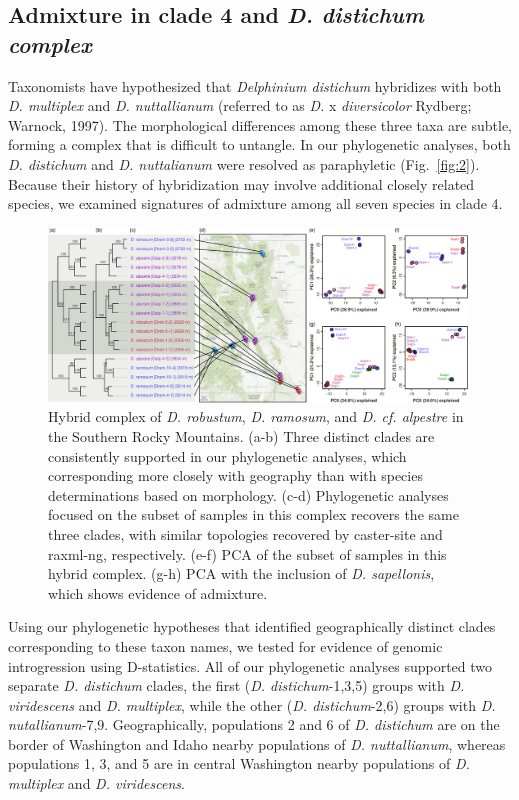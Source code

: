 \documentclass[11pt]{article}
\begin{document}
\subsection{Admixture in clade 4 and \emph{D. distichum complex}}
Taxonomists have hypothesized that \emph{Delphinium distichum} hybridizes with both 
\emph{D. multiplex} and \emph{D. nuttallianum} 
(referred to as \emph{D.} x \emph{diversicolor} Rydberg; Warnock, 1997).
% 
The morphological differences among these three taxa are subtle, forming a complex that 
is difficult to untangle. 
% 
In our phylogenetic analyses, both \emph{D. distichum} and \emph{D. nuttalianum} were
resolved as paraphyletic (Fig.~\ref{fig:2}). Because their history of hybridization
may involve additional closely related species, we examined signatures of admixture
among all seven species in clade 4. 
% 

\begin{figure}[t!]
	\centering
	  \includegraphics[width=0.99\textwidth]{./figures/ramosum-robustum-alpestre2}	
	\caption{
        Hybrid complex of \emph{D. robustum}, \emph{D. ramosum}, and \emph{D. cf. alpestre} in the Southern Rocky Mountains. 
        (a-b) Three distinct clades are consistently supported in our phylogenetic analyses, which corresponding more closely with geography than with species determinations based on morphology.
        (c-d) Phylogenetic analyses focused on the subset of samples in this complex
        recovers the same three clades, with similar topologies recovered by caster-site and raxml-ng, respectively.
        (e-f) PCA of the subset of samples in this hybrid complex.
        (g-h) PCA with the inclusion of \emph{D. sapellonis}, which shows evidence of admixture.        
	}
	\label{fig:robustum}
\end{figure}




Using our phylogenetic hypotheses that identified geographically distinct clades corresponding
to these taxon names, we tested for evidence of genomic introgression using D-statistics. 
All of our phylogenetic analyses supported two separate 
\emph{D. distichum} clades, the first (\emph{D. distichum}-1,3,5) groups with 
\emph{D. viridescens} and \emph{D. multiplex}, while the other 
(\emph{D. distichum}-2,6) groups with \emph{D. nutallianum}-7,9. 
Geographically, populations 2 and 6 of \emph{D. distichum} are on the border of 
Washington and Idaho nearby populations of \emph{D. nuttallianum}, whereas 
populations 1, 3, and 5 are in central Washington nearby populations of 
\emph{D. multiplex} and \emph{D. viridescens}. 
\end{document}
